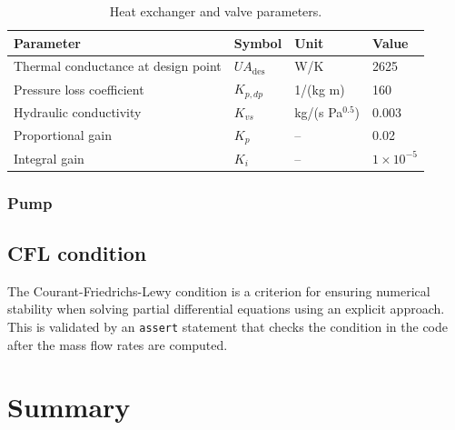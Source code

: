 


\begin{table}[h!]
\centering
\caption{Heat exchanger and valve parameters.}
\label{tab:hex_constants}
\begin{tabular}{llll}
\hline
\textbf{Parameter} & \textbf{Symbol} & \textbf{Unit} & \textbf{Value} \\
\hline
Thermal conductance at design point  & $UA_{\text{des}}$            & W/K        & 2625    \\
Pressure loss coefficient          & $K_{p,dp}$     & 1/(kg m)          & 160     \\
Hydraulic conductivity & $K_{vs}$       & kg/(s Pa$^{0.5}$) & 0.003   \\
Proportional gain                  & $K_p$          & --                & 0.02    \\
Integral gain                      & $K_i$          & --                & $1\times10^{-5}$ \\

\hline
\end{tabular}
\end{table}

\subsubsection{Pump}
\subsection{CFL condition}
The Courant-Friedrichs-Lewy condition is a criterion for ensuring numerical stability when solving partial differential equations using an explicit approach. This is validated by an \texttt{assert} statement that checks the condition in the code after the mass flow rates are computed.






\section{Summary}


